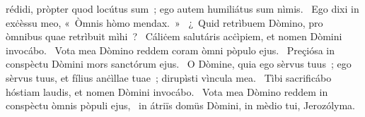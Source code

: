 \psalmChapterWithInscription{}
{ }
{%
rédidi, pròpter quod locútus sum~; ego autem humiliátus sum nìmis. 
~Ego dixi in exċèssu meo, «~Òmnis hòmo mendax.~»
~¿~Quid retrìbuem Dòmino, pro òmnibus quae retrìbuit mìhi~? 
~Cáliċem salutáris acċìpiem, et nomen Dòmini invocábo. 
~Vota mea Dòmino reddem coram òmni pòpulo ejus. 
~Preçiósa in conspèctu Dòmini mors sanctórum ejus. 
~O Dòmine, quia ego sèrvus tuus~; ego sèrvus tuus, et fílius anċìllae tuae~; dirupìsti vìncula mea. 
~Tìbi sacrificábo hóstiam laudis, et nomen Dòmini invocábo. 
~Vota mea Dòmino reddem in conspèctu òmnis pòpuli ejus, 
~in átriïs domüs Dòmini, in mèdio tui, Jerozólyma. 
}
